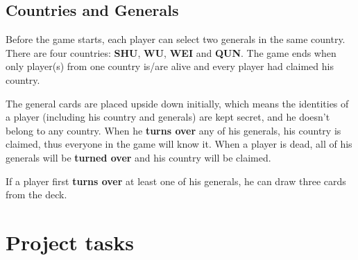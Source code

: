 \documentclass[11pt,a4paper]{article}
\begin{document}
\subsection{Countries and Generals}

Before the game starts, each player can select two generals in the same country. There are four countries: \textbf{SHU}, \textbf{WU}, \textbf{WEI} and \textbf{QUN}. The game ends when only player(s) from one country is/are alive and every player had claimed his country. \bigskip

The general cards are placed upside down initially, which means the identities of a player (including his country and generals) are kept secret, and he doesn't belong to any country. When he \textbf{turns over} any of his generals, his country is claimed, thus everyone in the game will know it. When a player is dead, all of his generals will be \textbf{turned over} and his country will be claimed. \bigskip

If a player first \textbf{turns over} at least one of his generals, he can draw three cards from the deck.





\section{Project tasks}
\end{document}
